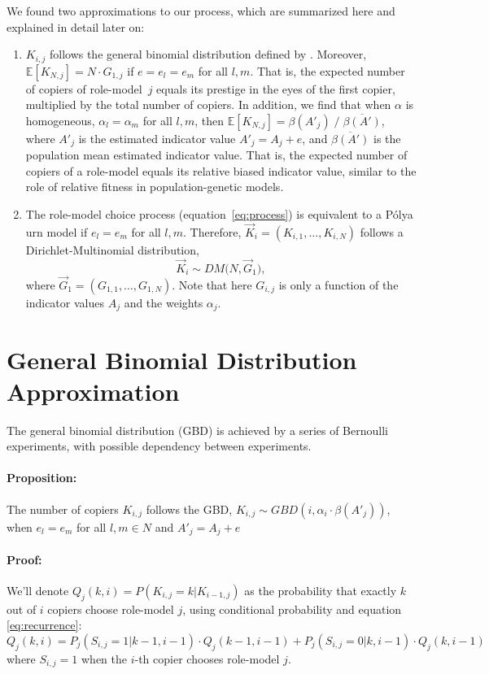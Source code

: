 \documentclass[11pt]{article}
\begin{document}
We found two approximations to our process, which are summarized here and explained in detail later on:
\begin{enumerate}
\item 
$K_{i,j}$ follows the general binomial distribution defined by \citet{GBD}.
Moreover, $\mathbb{E}[K_{N,j}] = N \cdot G_{1,j}$ if $e=e_l=e_m$ for all $l,m$.
 That is, the expected number of copiers of role-model~$j$ equals its prestige in the eyes of the first copier, multiplied by the total number of copiers. 
 In addition, we find that when $\alpha$ is homogeneous, $\alpha_l=\alpha_m$ for all $l,m$, then $\mathbb{E}[K_{N,j}] = \beta(A'_j) \; / \; \overline{\beta(A') }$, where $A'_j$ is the estimated indicator value $A'_j=A_j+e$, and 
 $\overline{ \beta(A') }$ is the population mean estimated indicator value. 
 That is, the expected number of copiers of a role-model equals its relative biased indicator value, similar to the role of relative fitness in population-genetic models.
\item The role-model choice process (equation~\ref{eq:process}) is equivalent to a P\'{o}lya urn model if $e_l=e_m$ for all $l,m$. 
Therefore, $\vec{K}_i = (K_{i,1}, \ldots, K_{i,N})$ follows a Dirichlet-Multinomial distribution,
\begin{equation}
\vec{K}_i \sim \mathit{DM}\big(N, \vec{G}_1\big), 
\end{equation}
where $\vec{G}_1 = (G_{1,1}, \ldots, G_{1,N})$.
Note that here $G_{i,j}$ is only a function of the indicator values $A_j$ and the weights $\alpha_j$.
\end{enumerate}


\section{General Binomial Distribution Approximation}
The general binomial distribution (GBD) is achieved by a series of Bernoulli experiments, with possible dependency between experiments.
\paragraph{Proposition:} The number of copiers $K_{i,j}$ follows the GBD, $K_{i,j} \sim GBD(i,\alpha_i\cdot\beta(A'_j))$, when $e_l=e_m$ for all $l,m \in N$ and $A'_j=A_j + e$ 
\paragraph{Proof: } We'll denote $Q_j(k,i)=P(K_{i,j} = k | K_{i-1,j})$ as the probability that exactly $k$ out of $i$ copiers choose role-model $j$, using conditional probability and equation \ref{eq:recurrence}:
\begin{equation}\label{recursive}
Q_j(k,i) = P_j(S_{i,j}=1 | k-1,i-1) \cdot Q_j(k-1,i-1) + P_j(S_{i,j} =0 | k,i-1) \cdot Q_j(k,i-1)
\end{equation}
where $S_{i,j} =1 $ when the $i$-th copier chooses role-model $j$.
\end{document}
